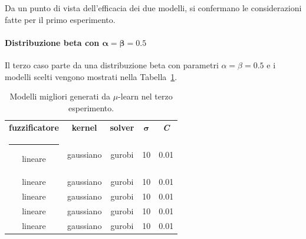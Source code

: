 \documentclass[12pt]{report}
\makeatletter
\theoremstyle{definition}
\newcommand{\thickhline}{%
    \noalign {\ifnum 0=`}\fi \hrule height 1pt
    \futurelet \reserved@a \@xhline
}
\makeatother
\begin{document}
Da un punto di vista dell'efficacia dei due modelli, si confermano le considerazioni fatte per il primo esperimento.

\paragraph{Distribuzione beta con $\bm{\alpha=\beta=0.5}$}
Il terzo caso parte da una distribuzione beta con parametri $\alpha=\beta=0.5$ e i modelli scelti vengono mostrati nella Tabella~\ref{models_exp3}.
\begin{table}
\centering
\begin{adjustbox}{max width=\textwidth}
 \begin{tabular}{|c|c|c|c|c|} 
 \hline
\textbf{fuzzificatore} & \textbf{kernel} & \textbf{solver} & $\bm{\sigma}$ & \textit{\textbf{C}}
\\ [0.5ex] 
 \thickhline
 lineare & gaussiano & gurobi & 10 & 0.01 \\
 lineare & gaussiano & gurobi & 10 & 0.01 \\
 lineare & gaussiano & gurobi & 10 & 0.01 \\
 lineare & gaussiano & gurobi & 10 & 0.01 \\
 lineare & gaussiano & gurobi & 10 & 0.01 \\
 \hline
\end{tabular}
\end{adjustbox}
\caption{Modelli migliori generati da $\mu$-learn nel terzo esperimento.}
\label{models_exp3}
\end{table}
\end{document}
